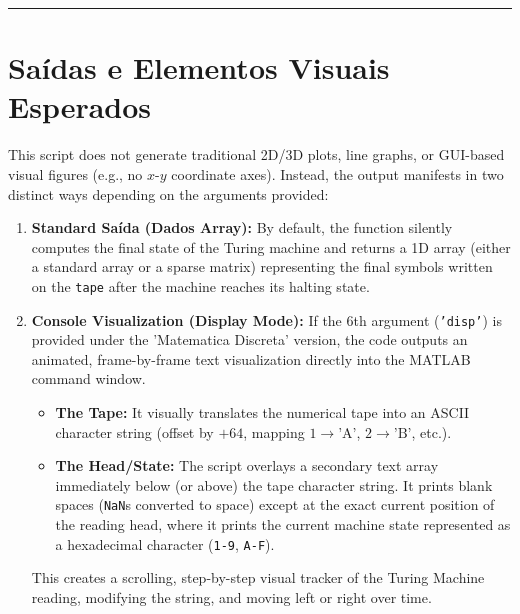 \vspace{1em}
\hrule
\vspace{1em}

\section*{Saídas e Elementos Visuais Esperados}

This script does not generate traditional 2D/3D plots, line graphs, or GUI-based visual figures (e.g., no $x$-$y$ coordinate axes). Instead, the output manifests in two distinct ways depending on the arguments provided:

\begin{enumerate}
    \item \textbf{Standard Saída (Dados Array):} By default, the function silently computes the final state of the Turing machine and returns a 1D array (either a standard array or a sparse matrix) representing the final symbols written on the \texttt{tape} after the machine reaches its halting state. 
    \item \textbf{Console Visualization (Display Mode):} If the 6th argument (\texttt{'disp'}) is provided under the 'Matematica Discreta' version, the code outputs an animated, frame-by-frame text visualization directly into the MATLAB command window. 
    \begin{itemize}
        \item \textbf{The Tape:} It visually translates the numerical tape into an ASCII character string (offset by $+64$, mapping $1 \rightarrow \text{'A'}$, $2 \rightarrow \text{'B'}$, etc.). 
        \item \textbf{The Head/State:} The script overlays a secondary text array immediately below (or above) the tape character string. It prints blank spaces (\texttt{NaN}s converted to space) except at the exact current position of the reading head, where it prints the current machine state represented as a hexadecimal character (\texttt{1-9}, \texttt{A-F}).
    \end{itemize}
    This creates a scrolling, step-by-step visual tracker of the Turing Machine reading, modifying the string, and moving left or right over time.
\end{enumerate}
